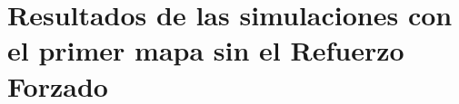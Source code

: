 \documentclass[lettersize, journal]{IEEEtran}
\begin{document}


\section{Resultados de las simulaciones con el primer mapa sin el Refuerzo Forzado}
\end{document}
